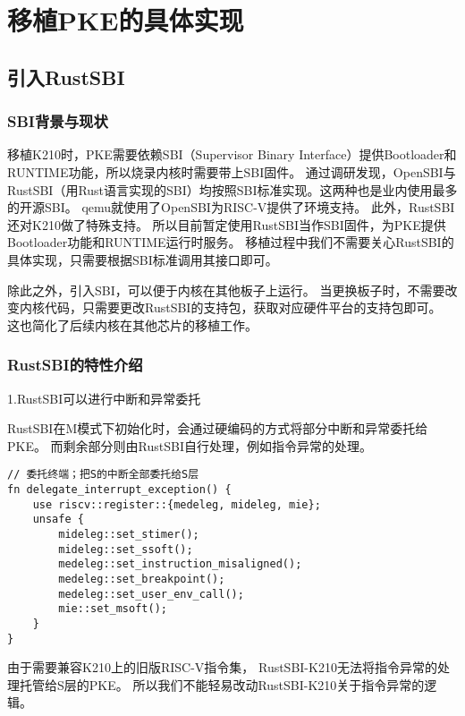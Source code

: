 \chapter{移植PKE的具体实现}

\section{引入RustSBI}

\subsection{SBI背景与现状}

移植K210时，PKE需要依赖SBI（Supervisor Binary Interface）提供Bootloader和RUNTIME功能，所以烧录内核时需要带上SBI固件。
通过调研发现，OpenSBI与RustSBI（用Rust语言实现的SBI）均按照SBI标准实现。这两种也是业内使用最多的开源SBI。
qemu就使用了OpenSBI为RISC-V提供了环境支持。
此外，RustSBI还对K210做了特殊支持。
所以目前暂定使用RustSBI当作SBI固件，为PKE提供Bootloader功能和RUNTIME运行时服务。
移植过程中我们不需要关心RustSBI的具体实现，只需要根据SBI标准调用其接口即可。

除此之外，引入SBI，可以便于内核在其他板子上运行。
当更换板子时，不需要改变内核代码，只需要更改RustSBI的支持包，获取对应硬件平台的支持包即可。
这也简化了后续内核在其他芯片的移植工作\cite{RustSBI_K210}。

\subsection{RustSBI的特性介绍}

1.RustSBI可以进行中断和异常委托
    
RustSBI在M模式下初始化时，会通过硬编码的方式将部分中断和异常委托给PKE。
而剩余部分则由RustSBI自行处理，例如指令异常的处理。

\begin{lstlisting}[caption={RustSBI的中断和异常委托}, label={lst:rustsbi_interrupt_and_exception}]
// 委托终端；把S的中断全部委托给S层
fn delegate_interrupt_exception() {
    use riscv::register::{medeleg, mideleg, mie};
    unsafe {
        mideleg::set_stimer();
        mideleg::set_ssoft();
        medeleg::set_instruction_misaligned();
        medeleg::set_breakpoint();
        medeleg::set_user_env_call();
        mie::set_msoft();
    }
}
\end{lstlisting}

由于需要兼容K210上的旧版RISC-V指令集，
RustSBI-K210无法将指令异常的处理托管给S层的PKE。
所以我们不能轻易改动RustSBI-K210关于指令异常的逻辑。


